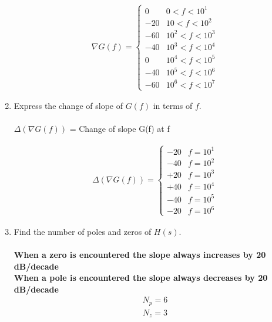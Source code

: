 \begin{enumerate}[label=\thesection.\arabic*.,ref=\thesection.\theenumi]
\begin{align}
 \nabla G(f) = 
 \begin{cases} 
        0 & 0 < f < 10^{1} \\
      -20 & 10 < f < 10^{2} \\
      -60 & 10^{2} < f < 10^{3} \\
      -40 & 10^{3} < f < 10^{4} \\
       0 & 10^{4} < f < 10^{5} \\
      -40 & 10^{5} < f < 10^{6} \\
      -60 & 10^{6} < f < 10^{7}   
 \end{cases}
\end{align}


\item Express the change of slope of $G(f)$ in terms of $f$.
\\
\solution\\
$\Delta(\nabla G(f))$  = Change of slope G(f) at f

\begin{align}
 \Delta(\nabla G(f)) = 
 \begin{cases} 
      -20 &  f = 10^{1} \\
      -40 &  f = 10^{2} \\
      +20 &  f = 10^{3} \\
      +40 &  f = 10^{4} \\
      -40 &  f = 10^{5} \\
      -20 &  f = 10^{6} 
 \end{cases}
\end{align}


\item Find the number of poles and zeros of $H(s)$.
\\
\solution \\
\textbf{When a zero is encountered the slope always increases by 20 dB/decade}\\
\textbf{When a pole is encountered the slope always decreases by 20 dB/decade}
\begin{align}
	N_{p} = 6  
\end{align}
\begin{align}
	N_{z} = 3
\end{align}



\end{enumerate}
